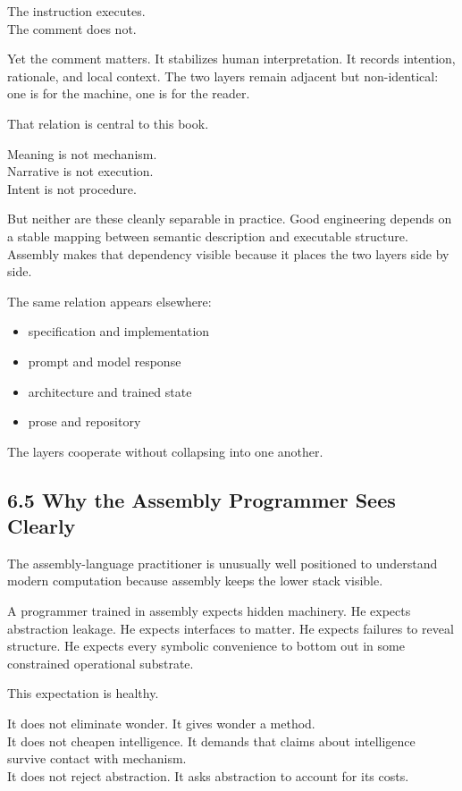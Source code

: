 \documentclass[
]{article}
\providecommand{\tightlist}{%
  \setlength{\itemsep}{0pt}\setlength{\parskip}{0pt}}
\begin{document}
The instruction executes.\\
The comment does not.

Yet the comment matters. It stabilizes human interpretation. It records
intention, rationale, and local context. The two layers remain adjacent
but non-identical: one is for the machine, one is for the reader.

That relation is central to this book.

Meaning is not mechanism.\\
Narrative is not execution.\\
Intent is not procedure.

But neither are these cleanly separable in practice. Good engineering
depends on a stable mapping between semantic description and executable
structure. Assembly makes that dependency visible because it places the
two layers side by side.

The same relation appears elsewhere:

\begin{itemize}
\tightlist
\item
  specification and implementation
\item
  prompt and model response
\item
  architecture and trained state
\item
  prose and repository
\end{itemize}

The layers cooperate without collapsing into one another.

\hypertarget{why-the-assembly-programmer-sees-clearly}{%
\subsection{6.5 Why the Assembly Programmer Sees
Clearly}\label{why-the-assembly-programmer-sees-clearly}}

The assembly-language practitioner is unusually well positioned to
understand modern computation because assembly keeps the lower stack
visible.

A programmer trained in assembly expects hidden machinery. He expects
abstraction leakage. He expects interfaces to matter. He expects
failures to reveal structure. He expects every symbolic convenience to
bottom out in some constrained operational substrate.

This expectation is healthy.

It does not eliminate wonder. It gives wonder a method.\\
It does not cheapen intelligence. It demands that claims about
intelligence survive contact with mechanism.\\
It does not reject abstraction. It asks abstraction to account for its
costs.
\end{document}
